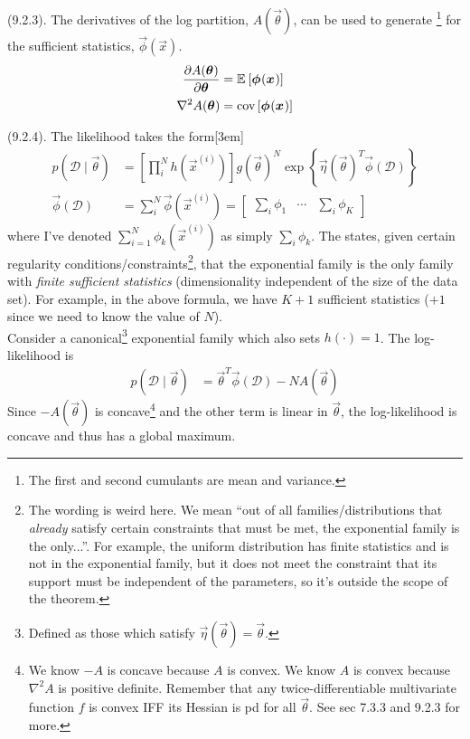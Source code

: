 \documentclass[11pt]{article}
\begin{document}
\myspace
\p {} (9.2.3). The derivatives of the log partition, $A(\vec\theta)$, can be used to generate \footnote{The first and second cumulants are mean and variance.} for the sufficient statistics, $\vec{\phi}(\vec x)$. 
\begin{align}
	\frac{\partial A(\bm{\theta}_{})}{\partial \bm{\theta}_{}} &= \mathbb{E}_{}\left[\bm{\phi}_{}(\bm{x}_{})\right] \\
	\nabla^2 A(\bm{\theta}_{}) &= \text{cov}\left[ \bm{\phi}_{}(\bm{x}_{}) \right]
\end{align}


\myspace
\p {} (9.2.4). The likelihood takes the form[3em]
\begin{align}
	p(\mathcal D \mid \vec\theta)
		&= \left[ \prod_i^N h(\vec{x}^{(i)}) \right] g(\vec\theta)^N \exp\left\{ \vec{\eta}(\vec\theta)^T \vec{\phi}(\mathcal D) \right\} \\
	\vec{\phi}(\mathcal D) 
		&=  \sum_i^N \vec{\phi}(\vec{x}^{(i)}) 
		= \begin{bmatrix} \sum_i \phi_1 & \cdots & \sum_i \phi_K  \end{bmatrix}
\end{align}
where I've denoted $\sum_{i=1}^N \phi_k(\vec{x}^{(i)})$ as simply $\sum_i \phi_k$. The  states, given certain regularity conditions/constraints\footnote{The wording is weird here. We mean ``out of all families/distributions that \textit{already} satisfy certain constraints that must be met, the exponential family is the only...''. For example, the uniform distribution has finite statistics and is not in the exponential family, but it does not meet the constraint that its support must be independent of the parameters, so it's outside the scope of the theorem.}, that the exponential family is the only family with \textit{finite sufficient statistics} (dimensionality independent of the size of the data set). For example, in the above formula, we have $K + 1$ sufficient statistics ($+1$ since we need to know the value of $N$). \\

\p Consider a canonical\footnote{Defined as those which satisfy $\vec{\eta}(\vec\theta) = \vec\theta$.} exponential family which also sets $h(\cdot) = 1$. The log-likelihood is
\begin{align}
	p(\mathcal D \mid \vec\theta)
		&= \vec\theta^T \vec{\phi}(\mathcal D) - N A (\vec\theta)
\end{align}
Since $-A(\vec\theta)$ is concave\footnote{We know $-A$ is concave because $A$ is convex. We know $A$ is convex because $\nabla^2 A$ is positive definite. Remember that any twice-differentiable multivariate function $f$ is convex IFF its Hessian is pd for all $\vec\theta$. See sec 7.3.3 and 9.2.3 for more.} and the other term is linear in $\vec\theta$, the log-likelihood is concave and thus has a global maximum.
\end{document}
